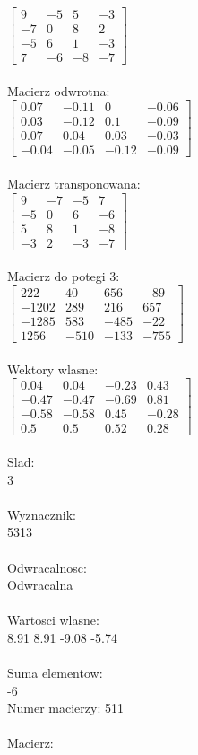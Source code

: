\documentclass[a4paper,12pt]{article}
\begin{document}
$\begin{bmatrix} 9&-5&5&-3\\-7&0&8&2\\-5&6&1&-3\\7&-6&-8&-7 \end{bmatrix}$
\\
\\
Macierz odwrotna:\\

$\begin{bmatrix} 0.07&-0.11&0&-0.06\\0.03&-0.12&0.1&-0.09\\0.07&0.04&0.03&-0.03\\-0.04&-0.05&-0.12&-0.09 \end{bmatrix}$
\\
\\
Macierz transponowana:\\

$\begin{bmatrix} 9&-7&-5&7\\-5&0&6&-6\\5&8&1&-8\\-3&2&-3&-7 \end{bmatrix}$
\\
\\
Macierz do potegi 3:\\

$\begin{bmatrix} 222&40&656&-89\\-1202&289&216&657\\-1285&583&-485&-22\\1256&-510&-133&-755 \end{bmatrix}$
\\
\\
Wektory wlasne:\\

$\begin{bmatrix} 0.04&0.04&-0.23&0.43\\-0.47&-0.47&-0.69&0.81\\-0.58&-0.58&0.45&-0.28\\0.5&0.5&0.52&0.28 \end{bmatrix}$
\\
\\
Slad:\\
3
\\
\\
Wyznacznik:\\
5313
\\
\\
Odwracalnosc:\\
Odwracalna
\\
\\
Wartosci wlasne:\\
8.91 8.91 -9.08 -5.74
\\
\\
Suma elementow:\\
-6
\\
\newpage
Numer macierzy:
511
\\
\\
Macierz:\\
\end{document}
